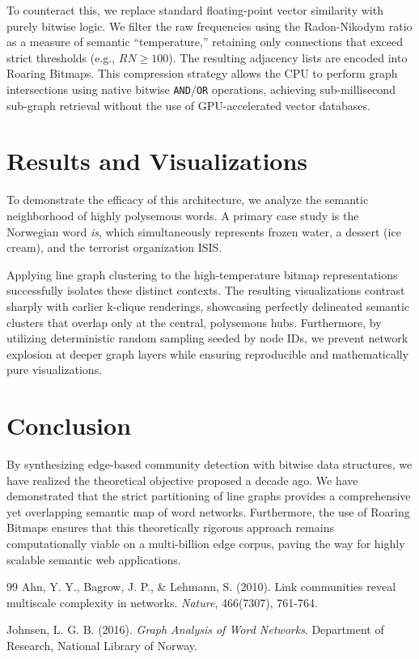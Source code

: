 \documentclass[11pt, a4paper]{article}
\begin{document}
To counteract this, we replace standard floating-point vector similarity with purely bitwise logic. We filter the raw frequencies using the Radon-Nikodym ratio as a measure of semantic ``temperature,'' retaining only connections that exceed strict thresholds (e.g., $RN \ge 100$). The resulting adjacency lists are encoded into Roaring Bitmaps. This compression strategy allows the CPU to perform graph intersections using native bitwise \texttt{AND}/\texttt{OR} operations, achieving sub-millisecond sub-graph retrieval without the use of GPU-accelerated vector databases.

\section{Results and Visualizations}
To demonstrate the efficacy of this architecture, we analyze the semantic neighborhood of highly polysemous words. A primary case study is the Norwegian word \textit{is}, which simultaneously represents frozen water, a dessert (ice cream), and the terrorist organization ISIS. 

Applying line graph clustering to the high-temperature bitmap representations successfully isolates these distinct contexts. The resulting visualizations contrast sharply with earlier k-clique renderings, showcasing perfectly delineated semantic clusters that overlap only at the central, polysemous hubs. Furthermore, by utilizing deterministic random sampling seeded by node IDs, we prevent network explosion at deeper graph layers while ensuring reproducible and mathematically pure visualizations.

\section{Conclusion}
By synthesizing edge-based community detection with bitwise data structures, we have realized the theoretical objective proposed a decade ago. We have demonstrated that the strict partitioning of line graphs provides a comprehensive yet overlapping semantic map of word networks. Furthermore, the use of Roaring Bitmaps ensures that this theoretically rigorous approach remains computationally viable on a multi-billion edge corpus, paving the way for highly scalable semantic web applications.

\begin{thebibliography}{99}
Ahn, Y. Y., Bagrow, J. P., \& Lehmann, S. (2010). Link communities reveal multiscale complexity in networks. \textit{Nature}, 466(7307), 761-764.

Johnsen, L. G. B. (2016). \textit{Graph Analysis of Word Networks}. Department of Research, National Library of Norway.
\end{thebibliography}
\end{document}
